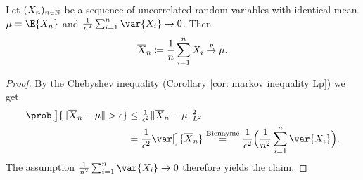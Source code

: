 \begin{corollary}
    \label{cor: weak law of large numbers}
    Let \((X_n)_{n\in \mathbb{N}}\) be a sequence of uncorrelated random variables
    with identical mean \(\mu= \E{X_n}\) and \(\frac1{n^2} \sum_{i=1}^n \var{X_i} \to 0\).
    Then
    \[
        \overline{X}_n\coloneq \frac1n \sum_{i=1}^n X_i \overset{p}\to \mu.
    \]
\end{corollary}
\begin{proof}
    By the Chebyshev inequality (Corollary \ref{cor: markov inequality Lp})
    we get
    \begin{equation*}
        \begin{aligned}
        \prob[\big]{\norm{\mean{X}_n - \mu} > \epsilon}
        &\le \tfrac1{\epsilon^2}\|\mean{X}_n - \mu\|_{L^2}^2
        \\
        &= \frac1{\epsilon^2} \var[\big]{\mean{X}_n}
        \overset{\text{Bienaymé}}= \frac1{\epsilon^2}\Bigl(\frac1{n^2} \sum_{i=1}^n \var{X_i}\Bigr).
        \end{aligned}
    \end{equation*}
    The assumption \(\frac1{n^2} \sum_{i=1}^n \var{X_i} \to 0\) therefore
    yields the claim.
\end{proof}


